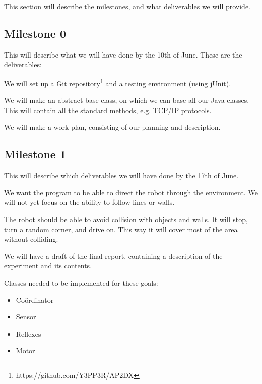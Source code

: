 This section will describe the milestones, and what deliverables we will provide. 

\subsection*{Milestone 0}
This will describe what we will have done by the 10th of June. These are the
deliverables:
\begin{description}
\addtolength{\itemsep}{-0.5\baselineskip}

\item[Working environment:] We will set up a Git
repository\footnote{https://github.com/Y3PP3R/AP2DX} and a testing environment
(using jUnit).
\item[Base class:] We will make an abstract base class, on which we can base
all our Java classes. This will contain all the standard methods, e.g. TCP/IP
protocols.
\item[Work plan:] We will make a work plan, consisting of our planning and
description.
\end{description}

\subsection*{Milestone 1}
This will describe which deliverables we will have done by the 17th of June.
\begin{description}
\addtolength{\itemsep}{-0.5\baselineskip}

\item[Drive:] We want the program to be able to direct
the robot through the environment. We will not yet focus on the ability to
follow lines or walls.
\item[Avoid collision:] The robot should be able to avoid collision with objects
and walls. It will stop, turn a random corner, and drive on. This way it will
cover most of the area without colliding. 
\item[Experiment and content of final report:] We will have a draft of the final
report, containing a description of the experiment and its contents.
\end{description}

Classes needed to be implemented for these goals:
\begin{itemize}
\item Co\"ordinator
\item Sensor
\item Reflexes
\item Motor
\end{itemize}

